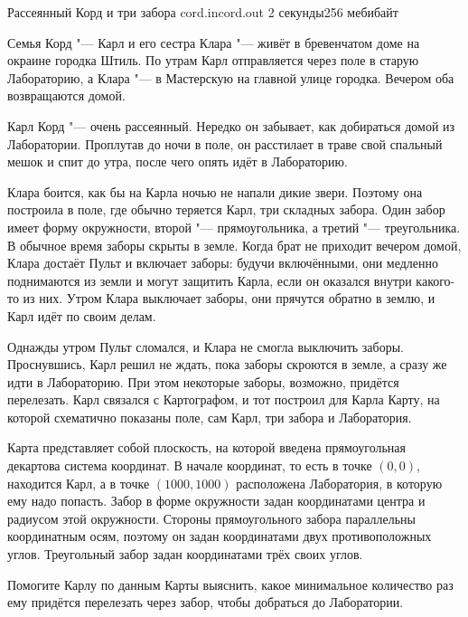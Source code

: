 \gdef\thisproblemauthor{Иван Казменко}
\gdef\thisproblemdeveloper{Иван Казменко}
\begin{problem}{Рассеянный Корд и три забора}
{cord.in}{cord.out}
{2 секунды}{256 мебибайт}{}

Семья Корд "--- Карл и его сестра Клара "--- живёт в бревенчатом доме
на окраине городка Штиль.
По утрам Карл отправляется через поле в старую Лабораторию,
а Клара "--- в Мастерскую на главной улице городка.
Вечером оба возвращаются домой.

Карл Корд "--- очень рассеянный.
Нередко он забывает, как добираться домой из Лаборатории.
Проплутав до ночи в поле, он расстилает в траве свой спальный мешок
и спит до утра, после чего опять идёт в Лабораторию.

Клара боится, как бы на Карла ночью не напали дикие звери.
Поэтому она построила в поле, где обычно теряется Карл, три складных забора.
Один забор имеет форму окружности, второй "--- прямоугольника,
а третий "--- треугольника.
В обычное время заборы скрыты в земле.
Когда брат не приходит вечером домой, Клара достаёт Пульт и включает заборы:
будучи включёнными, они медленно поднимаются из земли и могут защитить Карла,
если он оказался внутри какого-то из них.
Утром Клара выключает заборы, они прячутся обратно в землю,
и Карл идёт по своим делам.

Однажды утром Пульт сломался, и Клара не смогла выключить заборы.
Проснувшись, Карл решил не ждать, пока заборы скроются в земле,
а сразу же идти в Лабораторию.
При этом некоторые заборы, возможно, придётся перелезать.
Карл связался с Картографом, и тот построил для Карла Карту,
на которой схематично показаны поле, сам Карл, три забора и Лаборатория.

Карта представляет собой плоскость, на которой введена прямоугольная
декартова система координат.
В начале координат, то есть в точке $(0, 0)$, находится Карл,
а в точке $(1000, 1000)$ расположена Лаборатория, в которую ему надо попасть.
Забор в форме окружности задан координатами центра и радиусом этой окружности.
Стороны прямоугольного забора параллельны координатным осям, поэтому
он задан координатами двух противоположных углов.
Треугольный забор задан координатами трёх своих углов.

Помогите Карлу по данным Карты выяснить, какое минимальное количество раз
ему придётся перелезать через забор, чтобы добраться до Лаборатории.

\ifdefined\newpageafterlegend\newpage\fi


\end{problem}
